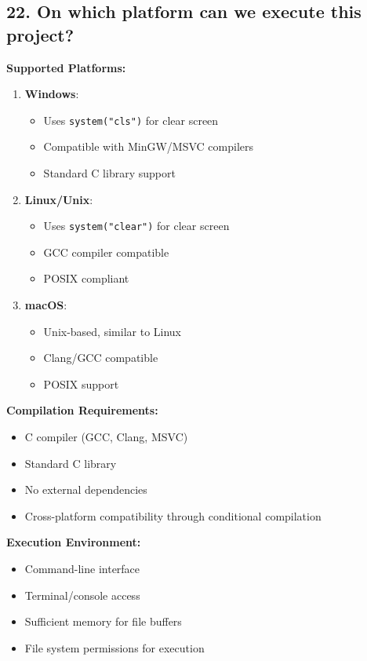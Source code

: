 \documentclass[11pt,a4paper]{article}
\begin{document}
\subsection{22. On which platform can we execute this project?}

\textbf{Supported Platforms:}
\begin{enumerate}
    \item \textbf{Windows}: 
    \begin{itemize}
        \item Uses \texttt{system("cls")} for clear screen
        \item Compatible with MinGW/MSVC compilers
        \item Standard C library support
    \end{itemize}
    
    \item \textbf{Linux/Unix}: 
    \begin{itemize}
        \item Uses \texttt{system("clear")} for clear screen
        \item GCC compiler compatible
        \item POSIX compliant
    \end{itemize}
    
    \item \textbf{macOS}: 
    \begin{itemize}
        \item Unix-based, similar to Linux
        \item Clang/GCC compatible
        \item POSIX support
    \end{itemize}
\end{enumerate}

\textbf{Compilation Requirements:}
\begin{itemize}
    \item C compiler (GCC, Clang, MSVC)
    \item Standard C library
    \item No external dependencies
    \item Cross-platform compatibility through conditional compilation
\end{itemize}

\textbf{Execution Environment:}
\begin{itemize}
    \item Command-line interface
    \item Terminal/console access
    \item Sufficient memory for file buffers
    \item File system permissions for execution
\end{itemize}
\end{document}
